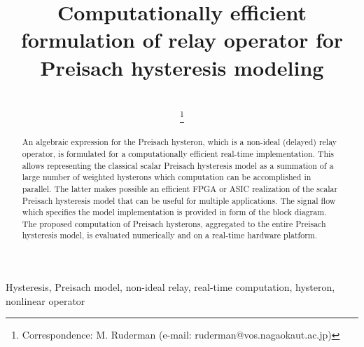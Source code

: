 \documentclass[journal]{IEEEtran}
\begin{document}
\title{Computationally efficient formulation of relay
operator for Preisach hysteresis modeling}





\author{\\\vspace{0.5cm}\thanks{ Correspondence: M. Ruderman (e-mail: ruderman@vos.nagaokaut.ac.jp)}
 }
























\maketitle


\begin{abstract}
\boldmath An algebraic expression for the Preisach hysteron, which
is a non-ideal (delayed) relay operator, is formulated for a
computationally efficient real-time implementation. This allows
representing the classical scalar Preisach hysteresis model as a
summation of a large number of weighted hysterons which
computation can be accomplished in parallel. The latter makes
possible an efficient FPGA or ASIC realization of the scalar
Preisach hysteresis model that can be useful for multiple
applications. The signal flow which specifies the model
implementation is provided in form of the block diagram. The
proposed computation of Preisach hysterons, aggregated to the
entire Preisach hysteresis model, is evaluated numerically and on
a real-time hardware platform.
\end{abstract}


\begin{IEEEkeywords}
Hysteresis, Preisach model, non-ideal relay, real-time
computation, hysteron, nonlinear operator
\end{IEEEkeywords}
\end{document}
